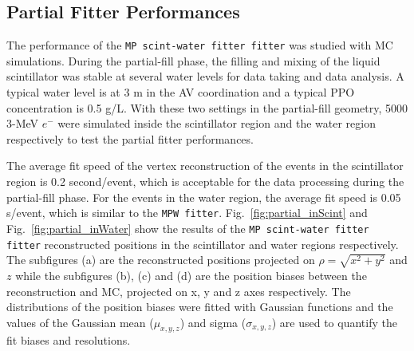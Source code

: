 \subsection{Partial Fitter Performances}
The performance of the \texttt{MP scint-water fitter fitter} was studied with MC simulations. During the partial-fill phase, the filling and mixing of the liquid scintillator was stable at several water levels for data taking and data analysis. A typical water level is at 3 m in the AV coordination and a typical PPO concentration is 0.5 g/L. With these two settings in the partial-fill geometry, 5000 3-MeV $e^-$ were simulated inside the scintillator region and the water region respectively to test the partial fitter performances.

The average fit speed of the vertex reconstruction of the events in the scintillator region is 0.2 second/event, which is acceptable for the data processing during the partial-fill phase. For the events in the water region, the average fit speed is 0.05 s/event, which is similar to the \texttt{MPW fitter}. Fig.~\ref{fig:partial_inScint} and Fig.~\ref{fig:partial_inWater} show the results of the \texttt{MP scint-water fitter fitter} reconstructed positions in the scintillator and water regions respectively. The subfigures (a) are the reconstructed positions projected on $\rho=\sqrt{x^2+y^2}$ and $z$ while the subfigures (b), (c) and (d) are the position biases between the reconstruction and MC, projected on x, y and z axes respectively. The distributions of the position biases were fitted with Gaussian functions and the values of the Gaussian mean ($\mu_{x,y,z}$) and sigma ($\sigma_{x,y,z}$) are used to quantify the fit biases and resolutions.

